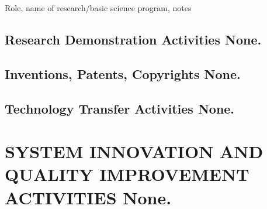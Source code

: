 \documentclass[11pt]{article}
\newenvironment{lyxlist}[1]
	{\begin{list}{}
		{\setlength\itemsep{-0.5ex}
		\settowidth{\labelwidth}{#1}
		 \setlength{\leftmargin}{\labelwidth}
		 \addtolength{\leftmargin}{\labelsep}
		 \renewcommand{\makelabel}[1]{##1\hfil}}}
	{\end{list}}
\begin{document}
\begin{lyxlist}{M/YY \textendash M/YY}
\item[{M/YY\textendash M/YY}]Role, name of research/basic science program, notes

\end{lyxlist}
	
\subsection*{Research Demonstration Activities \normalfont\textcolor{color0}{None.}}

\subsection*{Inventions, Patents, Copyrights \normalfont\textcolor{color0}{None.}}

\subsection*{Technology Transfer Activities \normalfont\textcolor{color0}{None.}}

\section*{SYSTEM INNOVATION AND QUALITY IMPROVEMENT ACTIVITIES \normalfont\textcolor{color0}{None.}}

	
\end{document}
